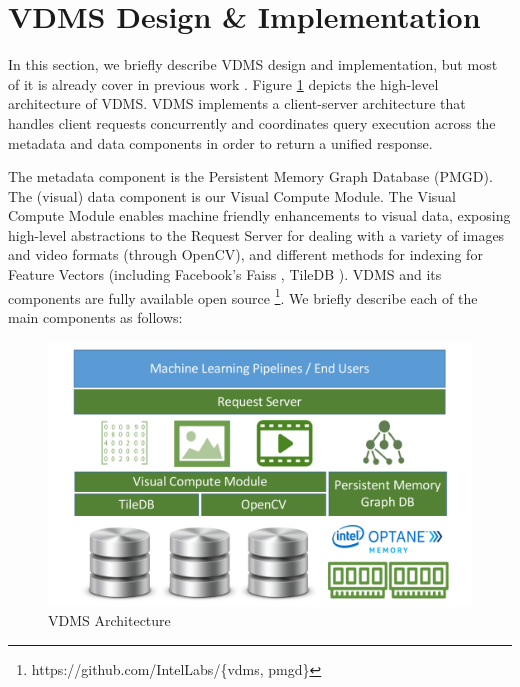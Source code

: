 \section{VDMS Design \& Implementation}
\label{arch}

In this section, we briefly describe VDMS design and implementation,
but most of it is already cover in previous work \cite{vdms-nips}.
Figure \ref{fig:arch} depicts the high-level architecture of VDMS.
VDMS implements a client-server architecture that handles client
requests concurrently and coordinates query execution across
the metadata and data components in order to return a unified response.

The metadata component is the Persistent Memory Graph
Database (PMGD). The (visual) data component is our Visual Compute Module.
The Visual Compute Module enables machine friendly enhancements to
visual data, exposing high-level abstractions to the Request Server for
dealing with a variety of images and video formats (through OpenCV),
and different methods for indexing for Feature Vectors
(including Facebook's Faiss \cite{faiss}, TileDB \cite{TileDB}).
VDMS and its components are fully available open source
\footnote{https://github.com/IntelLabs/\{vdms, pmgd\}}.
We briefly describe each of the main components as follows:

\begin{figure}[]
\centering
\includegraphics[width=1\columnwidth]{figures/vdms_arch.pdf}
\caption{VDMS Architecture}
\label{fig:arch}
\end{figure}


